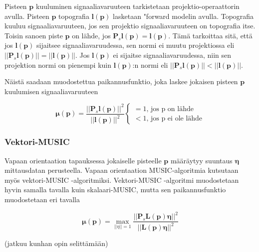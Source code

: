 Pisteen $\mathbf{p}$ kuuluminen signaaliavaruuteen tarkistetaan projektio-operaattorin avulla. Pisteen $\mathbf{p}$ topografia $\mathbf{l(p)}$ lasketaan "forward modelin avulla. Topografia kuuluu signaaliavaruuteen, jos sen projektio signaaliavaruuteen on topografia itse. Toisin sanoen piste $\mathbf{p}$ on lähde, jos $\mathbf{P}_s\mathbf{l(p)} = \mathbf{l(p)}$. Tämä tarkoittaa sitä, että jos $\mathbf{l(p)}$ sijaitsee signaaliavaruudessa, sen normi ei muutu projektiossa eli $||\mathbf{P}_s\mathbf{l(p)}||=||\mathbf{l(p)}||$. Jos $\mathbf{l(p)}$ ei sijaitse signaaliavaruudessa, niin sen projektion normi on pienempi kuin $\mathbf{l(p)}$:n normi eli
$||\mathbf{P}_s\mathbf{l(p)}||<||\mathbf{l(p)}||$.

Näistä saadaan muodostettua paikannusfunktio, joka laskee jokaisen pisteen $\mathbf{p}$ kuulumisen signaaliavaruuteen

\begin{equation}
    \mathbf{\mu(p)} = \frac{||\mathbf{P}_s\mathbf{l(p)}||^2}{||\mathbf{l(p)}||^2} 
    \begin{cases}
    =1\text{, jos p on lähde}\\
    <1\text{, jos p ei ole lähde}
     \end{cases}
\end{equation}

\subsubsection{Vektori-MUSIC}
Vapaan orientaation tapauksessa jokaiselle pisteelle $\mathbf{p}$ määräytyy suuntaus $\mathbf{\eta}$ mittausdatan perusteella. Vapaan orientaation MUSIC-algoritmia kutsutaan myös vektori-MUSIC -algoritmiksi. Vektori-MUSIC -algoritmi muodostetaan hyvin samalla tavalla kuin skalaari-MUSIC, mutta sen paikannusfunktio muodostetaan eri tavalla

\begin{equation}
    \mathbf{\mu(p)} = \max_{||\eta||=1} \frac{||\mathbf{P}_s\mathbf{L(p)\eta}||^2}{||\mathbf{L(p)\eta}||^2}
\end{equation}

(jatkuu kunhan opin selittämään)

